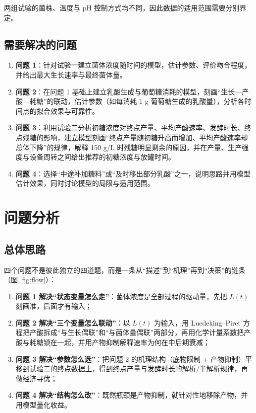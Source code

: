 \documentclass[12pt,a4paper]{ctexart}
\newcommand{\wj}[1]{\textbf{#1}}
\begin{document}
两组试验的菌株、温度与 pH 控制方式均不同，因此数据的适用范围需要分别界定。

\subsection{需要解决的问题}
\begin{enumerate}[leftmargin=2.2em,itemsep=0.15em]
\item \wj{问题 1}：针对试验一建立菌体浓度随时间的模型，估计参数、评价吻合程度，并给出最大生长速率与最终菌体量。
\item \wj{问题 2}：在问题 1 基础上建立乳酸生成与葡萄糖消耗的模型，刻画“生长—产酸—耗糖”的联动，估计参数（如每消耗 1 g 葡萄糖生成的乳酸量），分析各时间点的拟合效果与可靠性。
\item \wj{问题 3}：利用试验二分析初糖浓度对终点产量、平均产酸速率、发酵时长、终点残糖的影响，建立模型刻画“终点产量随初糖升高而增加、平均产酸速率却总体下降”的规律，解释 150 g/L 时残糖明显剩余的原因，并在产量、生产强度与设备周转之间给出推荐的初糖浓度与放罐时间。
\item \wj{问题 4}：选择“中途补加糖料”或“及时移出部分乳酸”之一，说明思路并用模型估计效果，同时讨论模型的局限与适用范围。
\end{enumerate}

\section{问题分析}

\subsection{总体思路}
四个问题不是彼此独立的四道题，而是一条从“描述”到“机理”再到“决策”的链条（图 \ref{fig:flow}）：

\begin{enumerate}[leftmargin=2.2em,itemsep=0.12em]
\item \wj{问题 1 解决“状态变量怎么走”}：菌体浓度是全部过程的驱动量，先把 $L(t)$ 刻画准，后面才有输入；
\item \wj{问题 2 解决“三个变量怎么联动”}：以 $L(t)$ 为输入，用 Luedeking--Piret 方程把产酸拆成“与生长偶联”和“与菌体量偶联”两部分，再用化学计量系数把产酸与耗糖锁在一起，并用产物抑制解释速率为何在中后期衰减；
\item \wj{问题 3 解决“参数怎么选”}：把问题 2 的机理结构（底物限制 + 产物抑制）平移到试验二的终点数据上，得到终点产量与发酵时长的解析/半解析规律，再做经济寻优；
\item \wj{问题 4 解决“结构怎么改”}：既然瓶颈是产物抑制，就针对性地移除产物，并用模型量化收益。
\end{enumerate}
\end{document}
